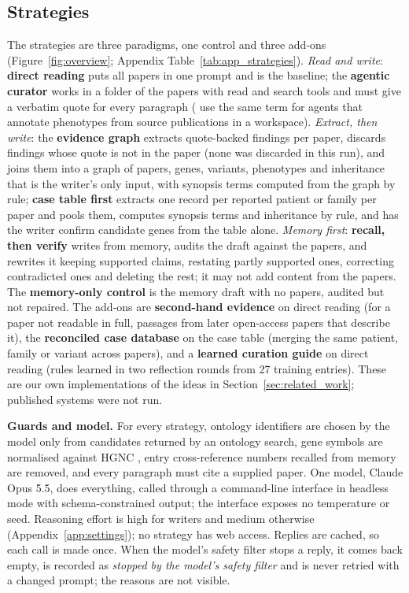 \documentclass{article} %
\begin{document}
\subsection{Strategies}
\label{sec:strategies}
The strategies are three paradigms, one control and three add-ons (Figure~\ref{fig:overview}; Appendix Table~\ref{tab:app_strategies}). \emph{Read and write}: \textbf{direct reading} puts all papers in one prompt and is the baseline; the \textbf{agentic curator} works in a folder of the papers with read and search tools and must give a verbatim quote for every paragraph (\citealp{balhoff2026frontier} use the same term for agents that annotate phenotypes from source publications in a workspace). \emph{Extract, then write}: the \textbf{evidence graph} extracts quote-backed findings per paper, discards findings whose quote is not in the paper (none was discarded in this run), and joins them into a graph of papers, genes, variants, phenotypes and inheritance that is the writer's only input, with synopsis terms computed from the graph by rule; \textbf{case table first} extracts one record per reported patient or family per paper and pools them, computes synopsis terms and inheritance by rule, and has the writer confirm candidate genes from the table alone. \emph{Memory first}: \textbf{recall, then verify} writes from memory, audits the draft against the papers, and rewrites it keeping supported claims, restating partly supported ones, correcting contradicted ones and deleting the rest; it may not add content from the papers. The \textbf{memory-only control} is the memory draft with no papers, audited but not repaired. The add-ons are \textbf{second-hand evidence} on direct reading (for a paper not readable in full, passages from later open-access papers that describe it), the \textbf{reconciled case database} on the case table (merging the same patient, family or variant across papers), and a \textbf{learned curation guide} on direct reading (rules learned in two reflection rounds from 27 training entries). These are our own implementations of the ideas in Section~\ref{sec:related_work}; published systems were not run.

\textbf{Guards and model.} For every strategy, ontology identifiers are chosen by the model only from candidates returned by an ontology search, gene symbols are normalised against HGNC \citep{seal2023genenames}, entry cross-reference numbers recalled from memory are removed, and every paragraph must cite a supplied paper. One model, Claude Opus 5.5, does everything, called through a command-line interface in headless mode with schema-constrained output; the interface exposes no temperature or seed. Reasoning effort is high for writers and medium otherwise (Appendix~\ref{app:settings}); no strategy has web access. Replies are cached, so each call is made once. When the model's safety filter stops a reply, it comes back empty, is recorded as \emph{stopped by the model's safety filter} and is never retried with a changed prompt; the reasons are not visible.
\end{document}
